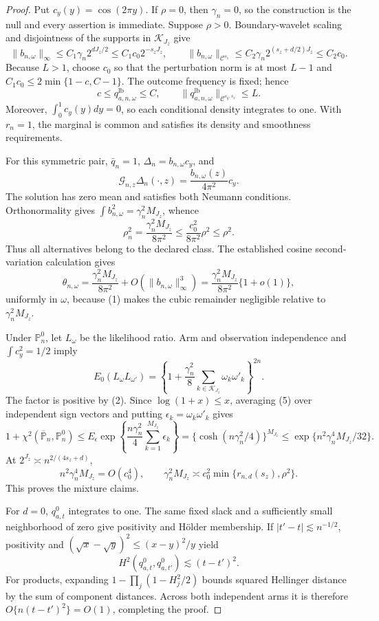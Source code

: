 \documentclass{article}
\begin{document}
\begin{proof}
Put \(c_y(y)=\cos(2\pi y)\).  If \(\rho=0\), then \(\gamma_n=0\), so the construction is the null and every assertion is immediate.  Suppose \(\rho>0\).  Boundary-wavelet scaling and disjointness of the supports in \(\mathcal K_{J_z}\) give
\[
\|b_{n,\omega}\|_\infty
\le C_1\gamma_n2^{dJ_z/2}\le C_1c_0 2^{-s_zJ_z},
\qquad
\|b_{n,\omega}\|_{\mathcal C^{s_z}}
\le C_2\gamma_n2^{(s_z+d/2)J_z}\le C_2c_0. \tag{1}
\]
Because \(L>1\), choose \(c_0\) so that the perturbation norm is at most \(L-1\) and \(C_1c_0\le2\min\{1-c,C-1\}\).  The outcome frequency is fixed; hence
\[
c\le q_{a,n,\omega}^{\mathrm{lb}}\le C,
\qquad \|q_{a,n,\omega}^{\mathrm{lb}}\|_{\mathcal C^{s_y,s_z}}\le L. \tag{2}
\]
Moreover, \(\int_0^1c_y(y)dy=0\), so each conditional density integrates to one.  With \(r_n=1\), the marginal is common and satisfies its density and smoothness requirements.

For this symmetric pair, \(\bar q_n=1\), \(\Delta_n=b_{n,\omega}c_y\), and
\[
\mathcal G_{n,z}\Delta_n(\cdot,z)
=\frac{b_{n,\omega}(z)}{4\pi^2}c_y.
\]
The solution has zero mean and satisfies both Neumann conditions.  Orthonormality gives \(\int b_{n,\omega}^2=\gamma_n^2M_{J_z}\), whence
\[
\rho_n^2=\frac{\gamma_n^2M_{J_z}}{8\pi^2}
\le\frac{c_0^2}{8\pi^2}\rho^2\le\rho^2. \tag{3}
\]
Thus all alternatives belong to the declared class.  The established cosine second-variation calculation gives
\[
\theta_{n,\omega}
=\frac{\gamma_n^2M_{J_z}}{8\pi^2}+O(\|b_{n,\omega}\|_\infty^3)
=\frac{\gamma_n^2M_{J_z}}{8\pi^2}\{1+o(1)\}, \tag{4}
\]
uniformly in \(\omega\), because (1) makes the cubic remainder negligible relative to \(\gamma_n^2M_{J_z}\).

Under \(\mathbb P_n^0\), let \(L_\omega\) be the likelihood ratio.  Arm and observation independence and \(\int c_y^2=1/2\) imply
\[
E_0(L_\omega L_{\omega'})
=\left\{1+\frac{\gamma_n^2}{8}\sum_{k\in\mathcal K_{J_z}}\omega_k\omega'_k\right\}^{2n}. \tag{5}
\]
The factor is positive by (2).  Since \(\log(1+x)\le x\), averaging (5) over independent sign vectors and putting \(\epsilon_k=\omega_k\omega'_k\) gives
\[
1+\chi^2(\overline{\mathbb P}_n,\mathbb P_n^0)
\le E_\epsilon\exp\!\left\{\frac{n\gamma_n^2}{4}\sum_{k=1}^{M_{J_z}}\epsilon_k\right\}
=\{\cosh(n\gamma_n^2/4)\}^{M_{J_z}}
\le\exp\{n^2\gamma_n^4M_{J_z}/32\}. \tag{6}
\]
At \(2^{J_z}\asymp n^{2/(4s_z+d)}\),
\[
n^2\gamma_n^4M_{J_z}=O(c_0^4),
\qquad
\gamma_n^2M_{J_z}\asymp c_0^2\min\{r_{n,d}(s_z),\rho^2\}. \tag{7}
\]
This proves the mixture claims.

For \(d=0\), \(q_{a,t}^0\) integrates to one.  The same fixed slack and a sufficiently small neighborhood of zero give positivity and H\"older membership.  If \(|t'-t|\lesssim n^{-1/2}\), positivity and \((\sqrt x-\sqrt y)^2\le(x-y)^2/y\) yield
\[
H^2(q_{a,t}^0,q_{a,t'}^0)\lesssim(t-t')^2.
\]
For products, expanding \(1-\prod_j(1-H_j^2/2)\) bounds squared Hellinger distance by the sum of component distances.  Across both independent arms it is therefore \(O\{n(t-t')^2\}=O(1)\), completing the proof.
\end{proof}
\end{document}
